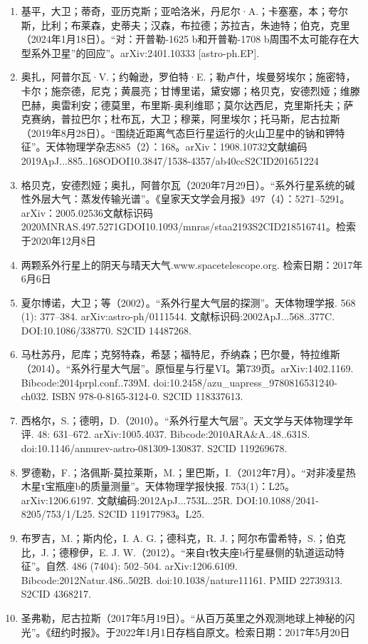 \begin{enumerate}
\item 基平，大卫；蒂奇，亚历克斯；亚哈洛米，丹尼尔·A.；卡塞塞，本；夸尔斯，比利；布莱森，史蒂夫；汉森，布拉德；苏拉吉，朱迪特；伯克，克里（2024年1月18日）。“对：开普勒-1625 b和开普勒-1708 b周围不太可能存在大型系外卫星”的回应”。arXiv:2401.10333 [astro-ph.EP].
\item 奥扎，阿普尔瓦·V.；约翰逊，罗伯特·E.；勒卢什，埃曼努埃尔；施密特，卡尔；施奈德，尼克；黄晨亮；甘博里诺，黛安娜；格贝克，安德烈娅；维滕巴赫，奥雷利安；德莫里，布里斯-奥利维耶；莫尔达西尼，克里斯托夫；萨克赛纳，普拉巴尔；杜布瓦，大卫；穆莱，阿里埃尔；托马斯，尼古拉斯（2019年8月28日）。“围绕近距离气态巨行星运行的火山卫星中的钠和钾特征”。天体物理学杂志885（2）：168。arXiv：1908.10732文献编码2019ApJ...885..168ODOI10.3847/1538-4357/ab40ccS2CID201651224
\item 格贝克，安德烈娅；奥扎，阿普尔瓦（2020年7月29日）。“系外行星系统的碱性外层大气：蒸发传输光谱”。《皇家天文学会月报》497（4）：5271–5291。arXiv：2005.02536文献标识码2020MNRAS.497.5271GDOI10.1093/mnras/staa2193S2CID218516741。检索于2020年12月8日
\item 两颗系外行星上的阴天与晴天大气.www.spacetelescope.org. 检索日期：2017年6月6日
\item 夏尔博诺，大卫；等（2002）。“系外行星大气层的探测”。天体物理学报. 568 (1): 377–384. arXiv:astro-ph/0111544. 文献标识码:2002ApJ...568..377C. DOI:10.1086/338770. S2CID 14487268.
\item 马杜苏丹，尼库；克努特森，希瑟；福特尼，乔纳森；巴尔曼，特拉维斯（2014）。“系外行星大气层”。原恒星与行星VI。第739页。arXiv:1402.1169. Bibcode:2014prpl.conf..739M. doi:10.2458/azu_uapress_9780816531240-ch032. ISBN 978-0-8165-3124-0. S2CID 118337613.
\item 西格尔，S.；德明，D.（2010）。“系外行星大气层”。天文学与天体物理学年评. 48: 631–672. arXiv:1005.4037. Bibcode:2010ARA&A..48..631S. doi:10.1146/annurev-astro-081309-130837. S2CID 119269678.
\item 罗德勒，F.；洛佩斯-莫拉莱斯，M.；里巴斯，I.（2012年7月）。“对非凌星热木星τ宝瓶座b的质量测量”。天体物理学报快报. 753(1)：L25。arXiv:1206.6197. 文献编码:2012ApJ...753L..25R. DOI:10.1088/2041-8205/753/1/L25. S2CID 119177983。L25.
\item 布罗吉，M.；斯内伦，I. A. G.；德科克，R. J.；阿尔布雷希特，S.；伯克比，J.；德穆伊，E. J. W.（2012）。“来自τ牧夫座b行星昼侧的轨道运动特征”。自然. 486 (7404): 502–504. arXiv:1206.6109. Bibcode:2012Natur.486..502B. doi:10.1038/nature11161. PMID 22739313. S2CID 4368217.
\item 圣弗勒，尼古拉斯（2017年5月19日）。“从百万英里之外观测地球上神秘的闪光”。《纽约时报》。于2022年1月1日存档自原文。检索日期：2017年5月20日

\end{enumerate}

